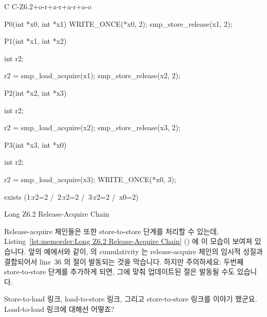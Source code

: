 \begin{listing}[tbp]
{ \scriptsize
\begin{verbbox}[\LstLineNo]
C C-Z6.2+o-r+a-r+a-r+a-o
{
}

P0(int *x0, int *x1)
{
  WRITE_ONCE(*x0, 2);
  smp_store_release(x1, 2);
}


P1(int *x1, int *x2)
{
  int r2;

  r2 = smp_load_acquire(x1);
  smp_store_release(x2, 2);
}

P2(int *x2, int *x3)
{
  int r2;

  r2 = smp_load_acquire(x2);
  smp_store_release(x3, 2);
}

P3(int *x3, int *x0)
{
  int r2;

  r2 = smp_load_acquire(x3);
  WRITE_ONCE(*x0, 3);
}

exists (1:r2=2 /\ 2:r2=2 /\ 3:r2=2 /\ x0=2)
\end{verbbox}
}
\centering
\theverbbox
\caption{Long Z6.2 Release-Acquire Chain}
\label{lst:memorder:Long Z6.2 Release-Acquire Chain}
\end{listing}

Release-acquire 체인들은 또한 store-to-store 단계를 처리할 수 있는데,
Listing~\ref{lst:memorder:Long Z6.2 Release-Acquire Chain}
()
에 이 모습이 보여져 있습니다.
앞의 예에서와 같이,  의 cumulativity 는 release-acquire
체인의 임시적 성질과 결합되어서 line~36 의  절이 발동되는 것을
막습니다.
하지만 주의하세요: 두번째 store-to-store 단계를 추가하게 되면, 그에 맞춰
업데이트된  절은 발동될 수도 있습니다.

\QuickQuiz{}
	Store-to-load 링크, load-to-store 링크, 그리고 store-to-store 링크를
	이야기 했군요.
	Load-to-load 링크에 대해선 어떻죠?
	\iffalse


